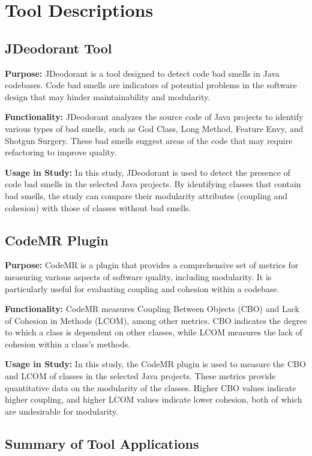\documentclass[conference]{IEEEtran}
\begin{document}
	\section{Tool Descriptions}

\subsection{JDeodorant Tool}

\textbf{Purpose:} JDeodorant is a tool designed to detect code bad smells in Java codebases. Code bad smells are indicators of potential problems in the software design that may hinder maintainability and modularity.

\textbf{Functionality:} JDeodorant analyzes the source code of Java projects to identify various types of bad smells, such as God Class, Long Method, Feature Envy, and Shotgun Surgery. These bad smells suggest areas of the code that may require refactoring to improve quality.

\textbf{Usage in Study:} In this study, JDeodorant is used to detect the presence of code bad smells in the selected Java projects. By identifying classes that contain bad smells, the study can compare their modularity attributes (coupling and cohesion) with those of classes without bad smells.

\subsection{CodeMR Plugin}

\textbf{Purpose:} CodeMR is a plugin that provides a comprehensive set of metrics for measuring various aspects of software quality, including modularity. It is particularly useful for evaluating coupling and cohesion within a codebase.

\textbf{Functionality:} CodeMR measures Coupling Between Objects (CBO) and Lack of Cohesion in Methods (LCOM), among other metrics. CBO indicates the degree to which a class is dependent on other classes, while LCOM measures the lack of cohesion within a class's methods.

\textbf{Usage in Study:} In this study, the CodeMR plugin is used to measure the CBO and LCOM of classes in the selected Java projects. These metrics provide quantitative data on the modularity of the classes. Higher CBO values indicate higher coupling, and higher LCOM values indicate lower cohesion, both of which are undesirable for modularity.

\subsection{Summary of Tool Applications}
\end{document}
